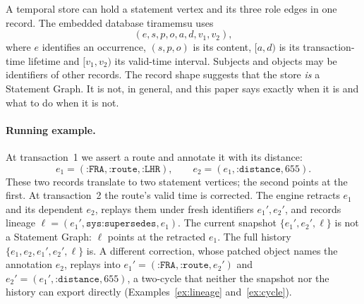 \documentclass[11pt]{article}
\theoremstyle{plain}
\theoremstyle{definition}
\theoremstyle{remark}
\newcommand{\sys}[1]{\texttt{sys:#1}}
\newcommand{\iri}[1]{\texttt{#1}}
\begin{document}
A temporal store can hold a statement vertex and its three role edges in one
record. The embedded database tiramemsu \cite{tiramemsu2026} uses
\[
(e,s,p,o,a,d,v_1,v_2),
\]
where $e$ identifies an occurrence, $(s,p,o)$ is its content, $[a,d)$ is its
transaction-time lifetime and $[v_1,v_2)$ its valid-time interval. Subjects and
objects may be identifiers of other records. The record shape suggests that the
store \emph{is} a Statement Graph. It is not, in general, and this paper says
exactly when it is and what to do when it is not.

\paragraph{Running example.}
At transaction~1 we assert a route and annotate it with its distance:
\[
e_1=(\iri{:FRA},\iri{:route},\iri{:LHR}),\qquad e_2=(e_1,\iri{:distance},655).
\]
These two records translate to two statement vertices; the second points at the
first. At transaction~2 the route's valid time is corrected. The engine retracts
$e_1$ and its dependent $e_2$, replays them under fresh identifiers $e_1',e_2'$,
and records lineage $\ell=(e_1',\sys{supersedes},e_1)$. The current snapshot
$\{e_1',e_2',\ell\}$ is not a Statement Graph: $\ell$ points at the retracted $e_1$.
The full history $\{e_1,e_2,e_1',e_2',\ell\}$ is. A different correction, whose
patched object names the annotation $e_2$, replays into
$e_1'=(\iri{:FRA},\iri{:route},e_2')$ and $e_2'=(e_1',\iri{:distance},655)$, a
two-cycle that neither the snapshot nor the history can export directly
(Examples~\ref{ex:lineage} and~\ref{ex:cycle}).
\end{document}
